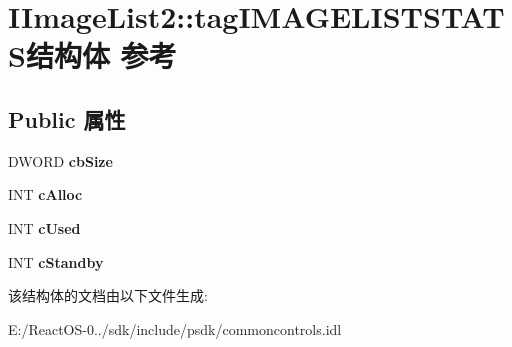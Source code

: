 \hypertarget{struct_i_image_list2_1_1tag_i_m_a_g_e_l_i_s_t_s_t_a_t_s}{}\section{I\+Image\+List2\+:\+:tag\+I\+M\+A\+G\+E\+L\+I\+S\+T\+S\+T\+A\+T\+S结构体 参考}
\label{struct_i_image_list2_1_1tag_i_m_a_g_e_l_i_s_t_s_t_a_t_s}
\subsection*{Public 属性}
\begin{DoxyCompactItemize}
\item 
\mbox{\label{struct_i_image_list2_1_1tag_i_m_a_g_e_l_i_s_t_s_t_a_t_s_a7d28b192c85ed5a37f15ea3ec2b950ed}} 
D\+W\+O\+RD {\bfseries cb\+Size}
\item 
\mbox{\label{struct_i_image_list2_1_1tag_i_m_a_g_e_l_i_s_t_s_t_a_t_s_a717fdcf36ef2893ae2cf797ae2476180}} 
I\+NT {\bfseries c\+Alloc}
\item 
\mbox{\label{struct_i_image_list2_1_1tag_i_m_a_g_e_l_i_s_t_s_t_a_t_s_a49c0d587cb26becff9e239c7027f1d5b}} 
I\+NT {\bfseries c\+Used}
\item 
\mbox{\label{struct_i_image_list2_1_1tag_i_m_a_g_e_l_i_s_t_s_t_a_t_s_a6187cd0ea4b512355aa59474735f77ff}} 
I\+NT {\bfseries c\+Standby}
\end{DoxyCompactItemize}


该结构体的文档由以下文件生成\+:\begin{DoxyCompactItemize}
\item 
E\+:/\+React\+O\+S-\/0../sdk/include/psdk/commoncontrols.\+idl\end{DoxyCompactItemize}
